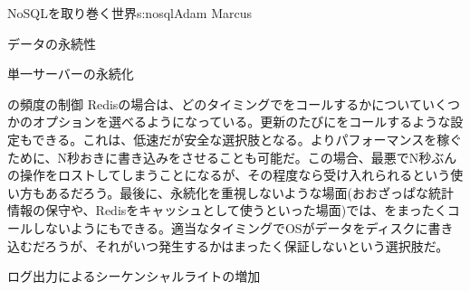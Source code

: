 \begin{aosachapter}{NoSQLを取り巻く世界}{s:nosql}{Adam Marcus}
\begin{aosasect1}{データの永続性}
\begin{aosasect2}{単一サーバーの永続化}
\begin{aosasect3}{の頻度の制御}
Redisの場合は、どのタイミングでをコールするかについていくつかのオプションを選べるようになっている。更新のたびにをコールするような設定もできる。これは、低速だが安全な選択肢となる。よりパフォーマンスを稼ぐために、N秒おきに書き込みをさせることも可能だ。この場合、最悪でN秒ぶんの操作をロストしてしまうことになるが、その程度なら受け入れられるという使い方もあるだろう。最後に、永続化を重視しないような場面(おおざっぱな統計情報の保守や、Redisをキャッシュとして使うといった場面)では、をまったくコールしないようにもできる。適当なタイミングでOSがデータをディスクに書き込むだろうが、それがいつ発生するかはまったく保証しないという選択肢だ。

\end{aosasect3}

\begin{aosasect3}{ログ出力によるシーケンシャルライトの増加}


\end{aosasect3}
\end{aosasect2}
\end{aosasect1}
\end{aosachapter}
